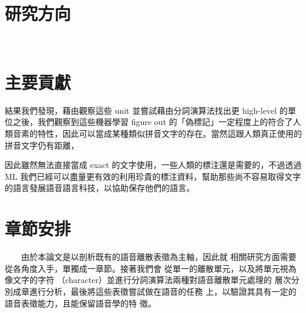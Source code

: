 \section{研究方向}
　　
\section{主要貢獻}  %

結果我們發現，藉由觀察這些 unit 並嘗試藉由分詞演算法找出更 high-level 的單位之後，我們觀察到這些機器學習 figure out 的「偽標記」一定程度上的符合了人類音素的特性，因此可以當成某種類似拼音文字的存在。當然這跟人類真正使用的拼音文字仍有距離，

因此雖然無法直接當成 exact 的文字使用，一些人類的標注還是需要的，不過透過 ML 我們已經可以盡量更有效的利用珍貴的標注資料，幫助那些尚不容易取得文字的語言發展語音語言科技，以協助保存他們的語言。


\section{章節安排}

　　由於本論文是以剖析既有的語音離散表徵為主軸，因此就
相關研究方面需要從各角度入手，單獨成一章節。接著我們會
從單一的離散單元，以及將單元視為像文字的字符
（character）並進行分詞演算法兩種對語音離散單元處理的
層次分別成章進行分析，最後將這些表徵嘗試做在語音的任務
上，以驗證其具有一定的語音表徵能力，且能保留語音學的特
徵。
